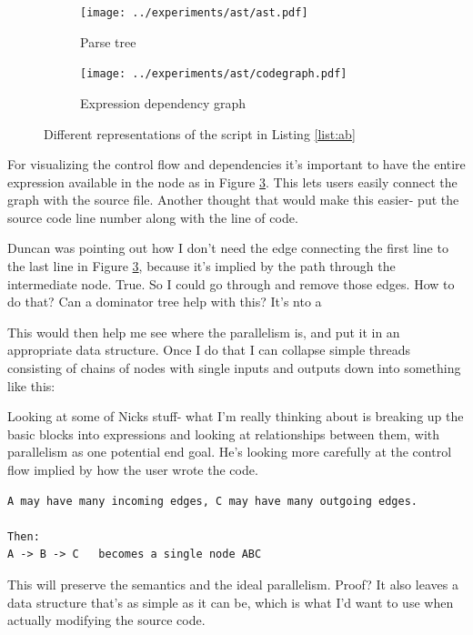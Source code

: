 \documentclass[12pt]{article}
\begin{document}


\begin{figure}
\centering
\begin{subfigure}{.6\textwidth}
    \centering
    \texttt{[image: ../experiments/ast/ast.pdf]}
    \caption{Parse tree}
    \label{fig:ast}
\end{subfigure}%
\begin{subfigure}{.4\textwidth}
  \centering
  \texttt{[image: ../experiments/ast/codegraph.pdf]}
  \caption{Expression dependency graph}
  \label{fig:codegraph}
\end{subfigure}
\caption{Different representations of the script in Listing \ref{list:ab}}
\end{figure}

For visualizing the control flow and dependencies it's important to have the entire
expression available in the node as in Figure \ref{fig:codegraph}. This
lets users easily connect the graph with the source file. Another thought
that would make this easier- put the source code line number along with the
line of code.

Duncan was pointing out how I don't need the edge connecting the first line
to the last line in Figure \ref{fig:codegraph}, because it's implied by the
path through the intermediate node. True. So I could go through and remove
those edges. How to do that? Can a dominator tree help with this? It's nto
a

This would then help me see where the parallelism is, and put it in an
appropriate data structure. Once I do that I can collapse simple threads
consisting of chains of nodes with single inputs and outputs
down into something like this:

Looking at some of Nicks stuff- what I'm really thinking about is breaking
up the basic blocks into expressions and looking at relationships between
them, with parallelism as one potential end goal. He's looking
more carefully at the control flow implied by how the user wrote the code.

\begin{verbatim}
A may have many incoming edges, C may have many outgoing edges.

Then:
A -> B -> C   becomes a single node ABC
\end{verbatim}

This will preserve the semantics and the ideal parallelism. Proof?
It also leaves a data structure that's as simple as it can be, which is
what I'd want to use when actually modifying the source code.
\end{document}
